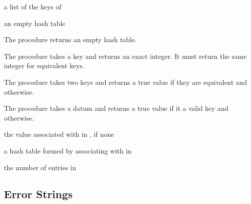 \begin{procedure}
\end{procedure}
\returns{} a list of the keys of 

\begin{procedure}
\end{procedure}
\returns{} an empty hash table

The  procedure returns an empty hash table.

The  procedure takes a key and returns an exact
integer. It must return the same integer for equivalent keys.

The  procedure takes two keys and returns a true value
if they are equivalent and  otherwise.

The  procedure takes a datum and returns a true value
if it a valid key and  otherwise.

\begin{procedure}
\end{procedure}
\returns{} the value associated with  in ,
 if none

\begin{procedure}
\end{procedure}
\returns{} a hash table formed by associating  with 
in 

\begin{procedure}
\end{procedure}
\returns{} the number of entries in 

\subsection{Error Strings}

